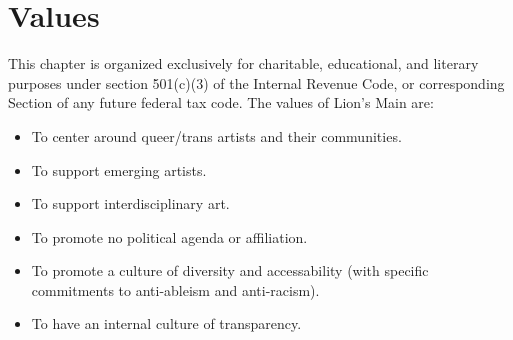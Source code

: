 \chapter{Values}\label{sec:values}

This chapter is organized exclusively for charitable, educational, and literary purposes under section 501(c)(3) of the Internal Revenue Code, or corresponding Section of any future federal tax code. The values of Lion's Main are:

\begin{itemize}
  \item To center around queer/trans artists and their communities.
  \item To support emerging artists.
  \item To support interdisciplinary art.
  \item To promote no political agenda or affiliation.
  \item To promote a culture of diversity and accessability (with specific commitments to anti-ableism and anti-racism).
  \item To have an internal culture of transparency.
\end{itemize}

